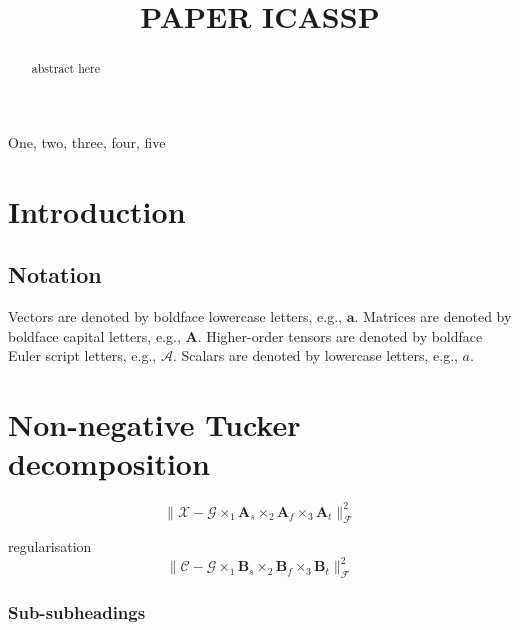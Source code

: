 \documentclass{article}
\title{PAPER ICASSP}
\def\F{{\mathcal F}}
\def\tA{\boldsymbol{{\mathscr A}}}
\def\X{\boldsymbol{{\mathscr X}}}
\def\G{\boldsymbol{{\mathscr G}}}
\def\C{\boldsymbol{{\mathscr C}}}
\def\A{{\mathbf A}}
\def\B{{\mathbf B}}
\begin{document}
%
\maketitle
%
\begin{abstract}
abstract here
\end{abstract}
%
\begin{keywords}
One, two, three, four, five
\end{keywords}
%
\section{Introduction}
\label{sec:intro}


\subsection*{Notation}
\label{ssec:notation}

Vectors are denoted by boldface lowercase letters, e.g., $\mathbf{a}$. Matrices are denoted by boldface capital letters, e.g., $\A$. Higher-order
tensors are denoted by boldface Euler script letters, e.g., $\tA$.
Scalars are denoted by lowercase letters, e.g., $a$.


\section{Non-negative Tucker decomposition}
\label{ssec:subhead}

$$
\| \X - \G \times_1 \A_s \times_2 \A_f  \times_3 \A_t \|_{\F}^2 
$$

regularisation
$$
\| \C - \G \times_1 \B_s \times_2 \B_f  \times_3 \B_t \|_{\F}^2
$$

 
\subsubsection{Sub-subheadings}
\label{sssec:subsubhead}
\end{document}
